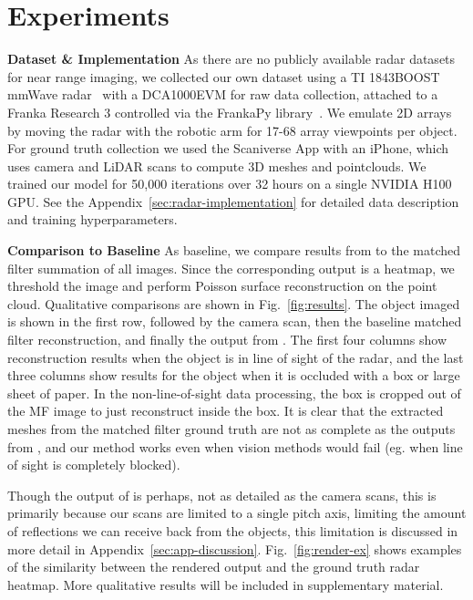 \section{Experiments}

\vspace{-0.5em}
\noindent \textbf{Dataset \& Implementation}
\label{sec:imp}
As there are no publicly available radar datasets for near range imaging, we collected our own dataset using a TI 1843BOOST mmWave radar~\cite{ti1843} with a DCA1000EVM for raw data collection, attached to a Franka Research 3 controlled via the FrankaPy library~\cite{frankapy}. We emulate 2D arrays by moving the radar with the robotic arm for 17-68 array viewpoints per object.
For ground truth collection we used the Scaniverse App with an iPhone, which uses camera and LiDAR scans to compute 3D meshes and pointclouds.
We trained our model for 50{,}000 iterations over 32 hours on a single NVIDIA H100 GPU.
See the Appendix~\ref{sec:radar-implementation} for detailed data description and training hyperparameters.


\vspace{-0.25em}
\noindent \textbf{Comparison to Baseline}
\label{sec:results}
As baseline, we compare results from \name{} to the matched filter summation of all images. Since the corresponding output is a heatmap, we threshold the image and perform Poisson surface reconstruction on the point cloud. Qualitative comparisons are shown in Fig.~\ref{fig:results}. The object imaged is shown in the first row, followed by the camera scan, then the baseline matched filter reconstruction, and finally the output from \name. The first four columns show reconstruction results when the object is in line of sight of the radar, and the last three columns show results for the object when it is occluded with a box or large sheet of paper. In the non-line-of-sight data processing, the box is cropped out of the MF image to just reconstruct inside the box.
It is clear that the extracted meshes from the matched filter ground truth are not as complete as the outputs from \name, and our method works even when vision methods would fail (eg. when line of sight is completely blocked).


Though the output of \name{} is perhaps, not as detailed as the camera scans, this is primarily because our scans are limited to a single pitch axis, limiting the amount of reflections we can receive back from the objects, this limitation is discussed in more detail in Appendix~\ref{sec:app-discussion}. Fig.~\ref{fig:render-ex} shows examples of the similarity between the rendered output and the ground truth radar heatmap.
More qualitative results will be included in supplementary material.


